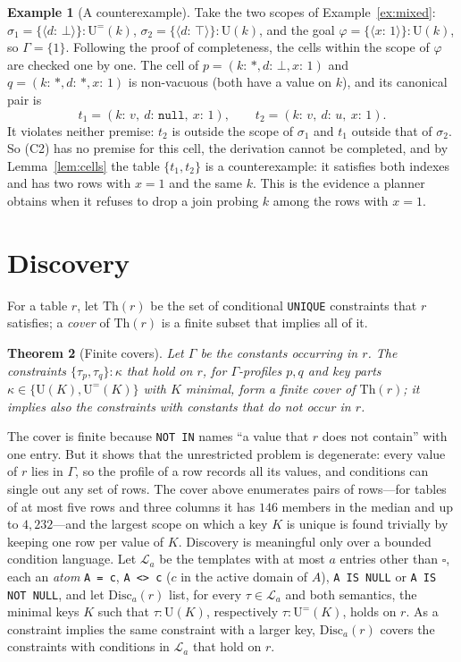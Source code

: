 \documentclass[conference]{IEEEtran}
\newtheorem{theorem}{Theorem}
\theoremstyle{definition}
\newtheorem{example}[theorem]{Example}
\newcommand{\sql}[1]{\texttt{#1}}
\newcommand{\nul}{\texttt{null}}
\newcommand{\U}[1]{\mathrm{U}(#1)}
\newcommand{\Ueq}[1]{\mathrm{U}^{=}(#1)}
\newcommand{\any}{\square}
\newcommand{\tpl}[1]{\ensuremath{\langle #1\rangle}}
\begin{document}
\begin{example}[A counterexample]\label{ex:counter}
Take the two scopes of Example~\ref{ex:mixed}: $\sigma_1=\{\tpl{d{:}\,\bot}\}:\Ueq{k}$,
$\sigma_2=\{\tpl{d{:}\,\top}\}:\U{k}$, and the goal $\varphi=\{\tpl{x{:}\,1}\}:\U{k}$, so $\Gamma=\{1\}$.
Following the proof of completeness, the cells within the scope of $\varphi$ are checked one by
one. The cell of $p=(k{:}\,*,d{:}\,\bot,x{:}\,1)$ and $q=(k{:}\,*,d{:}\,*,x{:}\,1)$ is non-vacuous
(both have a value on $k$), and its canonical pair is
\[
t_1=(k{:}\,v,\ d{:}\,\nul,\ x{:}\,1),\qquad t_2=(k{:}\,v,\ d{:}\,u,\ x{:}\,1).
\]
It violates neither premise: $t_2$ is outside the scope of $\sigma_1$ and $t_1$ outside that of
$\sigma_2$. So (C2) has no premise for this cell, the derivation cannot be completed, and by
Lemma~\ref{lem:cells} the table $\{t_1,t_2\}$ is a counterexample: it satisfies both indexes and
has two rows with $x=1$ and the same $k$. This is the evidence a planner obtains when it refuses
to drop a join probing $k$ among the rows with $x=1$.
\end{example}

\section{Discovery}\label{app:disc}

For a table $r$, let
$\mathrm{Th}(r)$ be the set of conditional \sql{UNIQUE} constraints that $r$ satisfies; a
\emph{cover} of $\mathrm{Th}(r)$ is a finite subset that implies all of it.

\begin{theorem}[Finite covers]\label{thm:cover}
Let $\Gamma$ be the constants occurring in $r$. The constraints $\{\tau_p,\tau_q\}:\kappa$ that hold on
$r$, for $\Gamma$-profiles $p,q$ and key parts $\kappa\in\{\U{K},\Ueq{K}\}$ with $K$ minimal, form a
finite cover of $\mathrm{Th}(r)$; it implies also the constraints with constants that do not
occur in $r$.
\end{theorem}

The cover is finite because \sql{NOT IN} names ``a value that $r$ does not contain'' with one
entry. But it shows that the unrestricted problem is degenerate: every value of $r$ lies in
$\Gamma$, so the profile of a row records all its values, and conditions can single out any set
of rows. The cover above enumerates pairs of rows---for tables of at most five rows and three
columns it has $146$ members in the median and up to $4{,}232$---and the largest scope on which
a key $K$ is unique is found trivially by keeping one row per value of $K$. Discovery is
meaningful only over a bounded condition language. Let $\mathcal L_a$ be the templates with at
most $a$ entries other than $\any$, each an \emph{atom} \sql{A = c}, \sql{A <> c} ($c$ in the
active domain of $A$), \sql{A IS NULL} or \sql{A IS NOT NULL}, and let $\mathrm{Disc}_a(r)$ list,
for every $\tau\in\mathcal L_a$ and both semantics, the minimal keys $K$ such that $\tau:\U{K}$,
respectively $\tau:\Ueq{K}$, holds on $r$. As a constraint implies the same constraint with a
larger key, $\mathrm{Disc}_a(r)$ covers the constraints with conditions in $\mathcal L_a$ that
hold on $r$.
\end{document}
